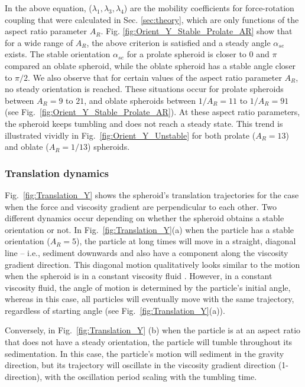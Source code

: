\documentclass{jfm}
\begin{document}
In the above equation, ($\lambda_1, \lambda_3,\lambda_4$) are the mobility coefficients for force-rotation coupling that were calculated in Sec. \ref{sec:theory}, which are only functions of the aspect ratio parameter $A_R$.  Fig. \ref{fig:Orient_Y_Stable_Prolate_AR}  show that for a wide range of $A_R$, the above criterion is satisfied and a steady angle $\alpha_{se}$ exists.  The stable orientation $\alpha_{se}$ for a prolate spheroid is closer to $0$ and $\pi$ compared an oblate spheroid, while the oblate spheroid has a stable angle closer to $\pi/2$. We also observe that for certain values of the aspect ratio parameter $A_R$, no steady orientation is reached. These situations occur for prolate spheroids between $A_R =9 $ to $21$, and oblate spheroids between $1/A_R =11$ to $1/A_R =91$ (see Fig.~\ref{fig:Orient_Y_Stable_Prolate_AR}). At these aspect ratio parameters, the spheroid keeps tumbling and does not reach a steady state.  This trend is illustrated vividly in Fig.~\ref{fig:Orient_Y_Unstable} for both prolate ($A_R =13$) and oblate ($A_R =1/13$) spheroids.

\subsubsection{Translation dynamics}
Fig.~\ref{fig:Translation_Y} shows the spheroid’s translation trajectories for the case when the force and viscosity gradient are perpendicular to each other. Two different dynamics occur depending on whether the spheroid obtains a stable orientation or not.  In Fig.~\ref{fig:Translation_Y}(a) when the particle has a stable orientation ($A_R =5$), the particle at long times will move in a straight, diagonal line – i.e., sediment downwards and also have a component along the viscosity gradient direction.  This diagonal motion qualitatively looks similar to the motion when the spheroid is in a constant viscosity fluid \citep{Leal2007}.  However, in a constant viscosity fluid, the angle of motion is determined by the particle’s initial angle, whereas in this case, all particles will eventually move with the same trajectory, regardless of starting angle (see Fig.~\ref{fig:Translation_Y}(a)).  

Conversely, in Fig.~\ref{fig:Translation_Y} (b) when the particle is at an aspect ratio that does not have a steady orientation, the particle will tumble throughout its sedimentation.  In this case, the particle’s motion will sediment in the gravity direction, but its trajectory will oscillate in the viscosity gradient direction (1-direction), with the oscillation period scaling with the tumbling time. 
\end{document}
